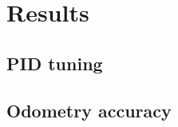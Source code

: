\documentclass[11pt]{article}
\begin{document}
\section{Results}

\subsection{PID tuning}
\label{subsec:pidt}

\subsection{Odometry accuracy}


\end{document}
